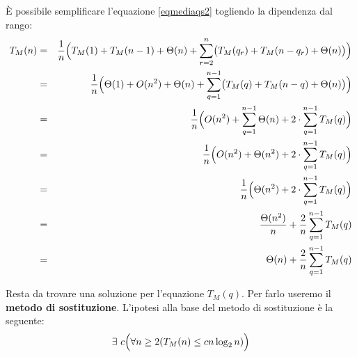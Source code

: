 È possibile semplificare l'equazione \ref{eqmediaqs2} togliendo la dipendenza dal rango:
\begin{eqnarray}
	T_{M}(n) &=& \frac{1}{n} \Bigl(T_{M}(1)+T_{M}(n-1)+\Theta(n)+ \sum_{r=2}^{n}\bigl(T_{M}(q_{r})+T_{M}(n-q_{r})+\Theta(n)\bigr)\Bigr) \nonumber \\
	&=& \frac{1}{n}\Bigl(\Theta(1)+O(n^{2})+\Theta(n)+\sum_{q=1}^{n-1}\bigl(T_{M}(q)+T_{M}(n-q)+\Theta(n)\bigr)\Bigr) \nonumber \\
	&=& \frac{1}{n}\Bigl(O(n^{2})+ \sum_{q=1}^{n-1}\Theta(n) + 2\cdot \sum_{q=1}^{n-1}T_{M}(q) \Bigr) \nonumber \\
	&=& \frac{1}{n}\Bigl( O(n^{2})+\Theta(n^{2})+2\cdot \sum_{q=1}^{n-1}T_{M}(q)\Bigr) \nonumber \\
	&=& \frac{1}{n}\Bigl(\Theta(n^{2})+2\cdot \sum_{q=1}^{n-1}T_{M}(q)\Bigr) \nonumber \\
	&=& \frac{\Theta(n^{2})}{n}+ \frac{2}{n} \sum_{q=1}^{n-1}T_{M}(q) \nonumber \\
	&=& \Theta(n) + \frac{2}{n} \sum_{q=1}^{n-1}T_{M}(q)
\end{eqnarray}

Resta da trovare una soluzione per l'equazione $T_{M}(q)$. Per farlo useremo il \textbf{metodo di sostituzione}. L'ipotesi alla base del metodo di sostituzione è la seguente:
\begin{equation}
	\exists \ c \Bigl( \forall n \geq 2 (T_{M}(n) \leq cn\log_{2}n)\Bigr)
\end{equation}

